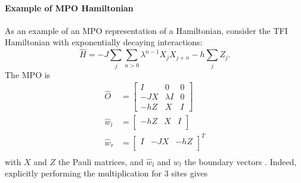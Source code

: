 \paragraph{Example of MPO Hamiltonian}

As an example of an MPO representation of a Hamiltonian, consider the \Gls{TFI} Hamiltonian with exponentially decaying interactions:
\begin{equation}
    \hat{H} =  -J   \sum_{j}   \sum_{n>0} \lambda^{n-1} X_j X_{j+n} - h \sum_j Z_j .
\end{equation}
The MPO is
\begin{equation}
    \begin{split}
        \hat{O} &= \begin{bmatrix}
            I    & 0         & 0 \\
            -J X & \lambda I & 0 \\
            -h Z & X         & I
        \end{bmatrix} \\
        \hat{w}_l &= \begin{bmatrix}
            -h Z & X & I \\
        \end{bmatrix} \\
        \hat{w}_r &= \begin{bmatrix}
            I & -J  X & -h Z \\
        \end{bmatrix}^T \\
    \end{split}
\end{equation}
with $X$ and  $Z$ the Pauli matrices, and  $\hat{w}_l$ and  $\hat{w}_l$ the boundary vectors \cite{Zauner-Stauber2018}. Indeed, explicitly performing the multiplication for 3 sites gives
